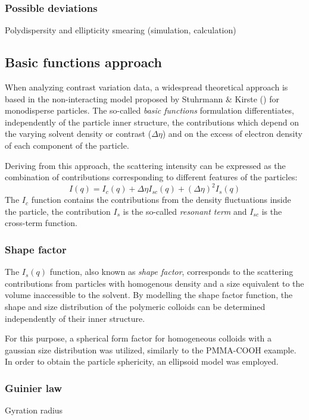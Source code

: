 \subsubsection{Possible deviations}
Polydispersity and ellipticity smearing (simulation, calculation)
\subsection{Basic functions approach}
When analyzing contrast variation data, a widespread theoretical approach is based in the non-interacting model proposed by Stuhrmann $\&$ Kirste (\citeyear{stuhrmann_elimination_1965,stuhrmann_elimination_1967}) for monodisperse particles. The so-called \emph{basic functions} formulation differentiates, independently of the particle inner structure, the contributions which depend on the varying solvent density or contrast (\(\Delta\eta\)) and on the excess of electron density of each component of the particle. 

Deriving from this approach, the scattering intensity can be expressed as the combination of contributions corresponding to different features of the particles:
\begin{equation}
\label{eq:intensity_contrast}
I(q)=I_c(q)+\Delta\eta I_{sc}(q)+(\Delta\eta)^2 I_{s}(q)
\end{equation}
The $I_c$ function contains the contributions from the density fluctuations inside the particle, the contribution $I_s$ is the so-called \emph{resonant term} and $I_{sc}$ is the cross-term function.


\subsubsection{Shape factor}
The $I_s(q)$ function, also known as \emph{shape factor}, corresponds to the scattering contributions from particles with homogenous density and a size equivalent to the volume inaccessible to the solvent. By modelling the shape factor function, the shape and size distribution of the polymeric colloids can be determined independently of their inner structure.

For this purpose, a spherical form factor for homogeneous colloids with a gaussian size distribution was utilized, similarly to the PMMA-COOH example. In order to obtain the particle sphericity, an ellipsoid model was employed.


\subsubsection{Guinier law}
\label{sec:TheoryGuinier}
Gyration radius

